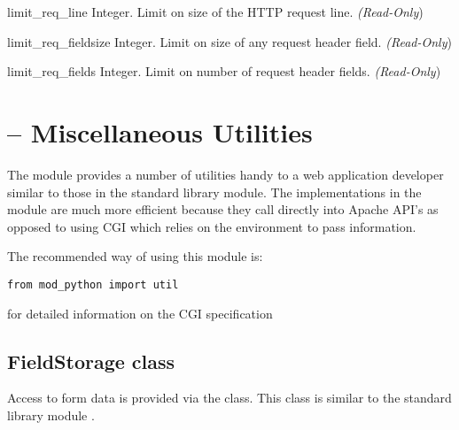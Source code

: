 \begin{memberdesc}[server]{limit_req_line}
  Integer. Limit on size of the HTTP request line.
  \emph{(Read-Only})
\end{memberdesc}

\begin{memberdesc}[server]{limit_req_fieldsize}
  Integer. Limit on size of any request header field.
  \emph{(Read-Only})
\end{memberdesc}

\begin{memberdesc}[server]{limit_req_fields}
  Integer. Limit on number of request header fields.
  \emph{(Read-Only})
\end{memberdesc}

\section{ -- Miscellaneous Utilities\label{pyapi-util}}

The  module provides a number of utilities handy to a web
application developer similar to those in the standard library
 module. The implementations in the  module
are much more efficient because they call directly into Apache API's
as opposed to using CGI which relies on the environment to pass
information.

The recommended way of using this module is:
\begin{verbatim}
from mod_python import util
\end{verbatim}

\begin{seealso}
           {for detailed information on the CGI specification}
\end{seealso}

\subsection{FieldStorage class\label{pyapi-util-fstor}}

Access to form data is provided via the 
class. This class is similar to the standard library module
 .


